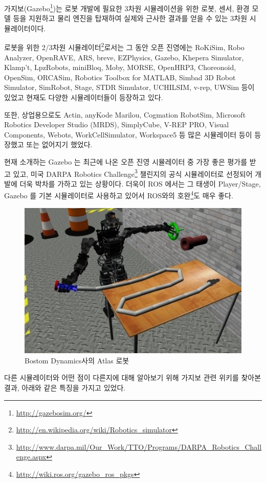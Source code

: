 가지보(Gazebo\footnote{\url{http://gazebosim.org/}})는 로봇 개발에 필요한 3차원 시뮬레이션을 위한 로봇, 센서, 환경 모델 등을 지원하고 물리 엔진을 탑재하여 실제와 근사한 결과를 얻을 수 있는 3차원 시뮬레이터이다. 

로봇을 위한 2/3차원 시뮬레이터\footnote{\url{http://en.wikipedia.org/wiki/Robotics_simulator}}로서는 그 동안 오픈 진영에는  RoKiSim, Robo Analyzer, OpenRAVE, ARS, breve, EZPhysics, Gazebo, Khepera Simulator, Klamp't, LpzRobots, miniBloq, Moby, MORSE, OpenHRP3, Choreonoid, OpenSim, ORCASim, Robotics Toolbox for MATLAB, Simbad 3D Robot Simulator, SimRobot, Stage, STDR Simulator, UCHILSIM, v-rep, UWSim 등이 있었고 현재도 다양한 시뮬레이터들이 등장하고 있다.

또한, 상업용으로도 Actin, anyKode Marilou, Cogmation RobotSim, Microsoft Robotics Developer Studio (MRDS), SimplyCube, V-REP PRO, Visual Components, Webots, WorkCellSimulator, Workspace5 등 많은 시뮬레이터 등이 등장했고 또는 없어지기 했었다. 

현재 소개하는 Gazebo 는 최근에 나온 오픈 진영 시뮬레이터 중 가장 좋은 평가를 받고 있고, 미국 DARPA Robotics Challenge\footnote{\url{http://www.darpa.mil/Our_Work/TTO/Programs/DARPA_Robotics_Challenge.aspx}} 챌린지의 공식 시뮬레이터로 선정되어 개발에 더욱 박차를 가하고 있는 상황이다. 더욱이 ROS 에서는 그 태생이 Player/Stage, Gazebo 를 기본 시뮬레이터로 사용하고 있어서 ROS와의 호완\footnote{\url{http://wiki.ros.org/gazebo_ros_pkgs}}도 매우 좋다.

\begin{figure}[h]
\centering\includegraphics[width=0.7\columnwidth]{pictures/chapter10/darpa_hose_atlas.jpg}
\caption{Bostom Dynamics사의 Atlas 로봇}
\end{figure}

다른 시뮬레이터와 어떤 점이 다른지에 대해 알아보기 위해 가지보 관련 위키를 찾아본 결과, 아래와 같은 특징을 가지고 있었다.

\setcounter{num}{0}

